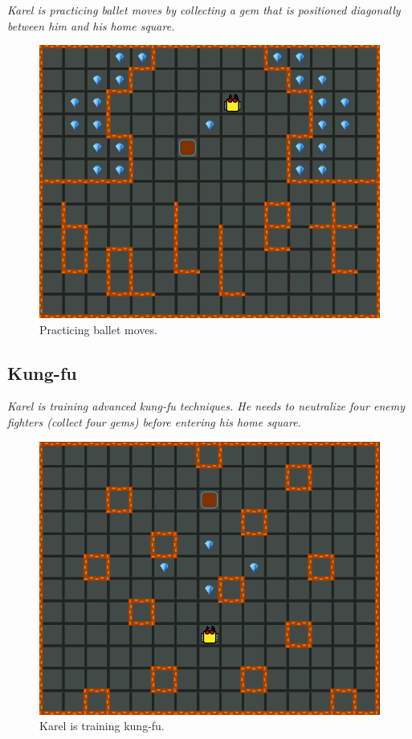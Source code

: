 {\em Karel is practicing ballet moves by collecting a gem that is positioned diagonally between him and his home square.}

\begin{figure}[!ht]
\begin{center}
\includegraphics[height=0.4\textwidth]{img/b03.png}
\end{center}
\vspace{-4mm}
\caption{Practicing ballet moves.}
\label{fig:b03}
\vspace{-1cm}
\end{figure}

\subsection{Kung-fu}
{\em Karel is training advanced kung-fu techniques. He needs to neutralize four enemy fighters (collect four gems) before entering his home square.}

\begin{figure}[!ht]
\begin{center}
\includegraphics[height=0.4\textwidth]{img/a19.png}
\end{center}
\vspace{-4mm}
\caption{Karel is training kung-fu.}
\label{fig:b06}
\vspace{-10mm}
\end{figure}


